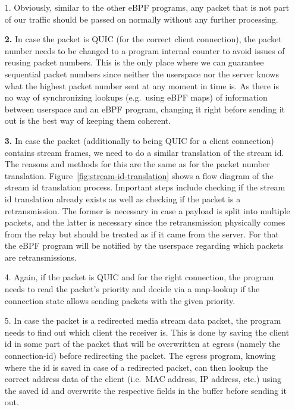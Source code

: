 \begin{enumerate}
    \item[1.]   Obviously, similar to the other eBPF programs, any packet that is not part of our traffic 
            should be passed on normally without any further processing.
    \item[\textbf{2.}] In case the packet is QUIC (for the correct client connection), the packet number 
            needs to be changed to a program internal counter to avoid issues of reusing packet numbers. 
            This is the only place where we can guarantee sequential packet numbers since neither 
            the userspace nor the server knows what the highest packet number sent at any moment in time is. 
            As there is no way of synchronizing lookups (e.g.~using eBPF maps) of information between userspace 
            and an eBPF program, changing it right before sending it out is the best way of keeping them coherent. 
    \item[\textbf{3.}] In case the packet (additionally to being QUIC for a client connection) contains 
                        stream frames, we need to do a similar translation of the stream id.
                        The reasons and methods for this are the same as for the packet number translation.
                        Figure~\ref{fig:stream-id-translation} shows a flow diagram of the stream id translation
                        process.
                        Important steps include checking if the stream id translation already exists as well
                        as checking if the packet is a retransmission.
                        The former is necessary in case a payload is split into multiple packets, and the latter is 
                        necessary since the retransmission physically comes from the relay but should be treated as 
                        if it came from the server. For that the eBPF program will be notified by the userspace 
                        regarding which packets are retransmissions.
    \item[4.] Again, if the packet is QUIC and for the right connection, the program needs 
                        to read the packet's priority and decide via a map-lookup if the connection 
                        state allows sending packets with the given priority.
    \item[5.] In case the packet is a redirected media stream data packet, the program needs to find out 
            which client the receiver is. 
            This is done by saving the client id in some part of the packet that will be 
            overwritten at egress (namely the connection-id) before redirecting the packet.
            The egress program, knowing where the id is saved in case of a redirected packet, can then
            lookup the correct address data of the client (i.e.~MAC address, IP address, etc.) using 
            the saved id and overwrite the respective fields in the buffer before sending it out.
\end{enumerate}

